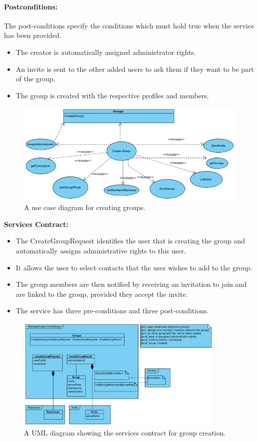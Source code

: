 \documentclass[11pt]{article}
\begin{document}
\paragraph{{Postconditions:}}The post-conditions specify the conditions which must hold true when the service has been provided.
\begin{itemize}
\item	The creator is automatically assigned administrator rights.
\item	An invite is sent to the other added users to ask them if they want to be part of the group.
\item	The group is created with the respective profiles and members.
\end{itemize}
\begin{figure}[H]
\centering
\includegraphics[width=5in]{./images/FR-create.jpg}
\caption[UC-figure-create-group]{A use case diagram for creating groups.}
\label{UC-figure-create-group}
\end{figure}
\textbf{Services Contract:}
\begin{itemize}
\item The CreateGroupRequest identifies the user that is creating the group and automatically assigns administrative rights to this user.
\item It allows the user to select contacts that the user wishes to add to the group.
\item The group members are then notified by receiving an invitation to join and are linked to the group, provided they accept the invite.
\item The service has three pre-conditions and three post-conditions.
\end{itemize}
\begin{figure}[H]
\centering
\includegraphics[width=380px]{./images/serviceContract-create.jpg} \newline
\caption[Create Group Services Contract]{A UML diagram showing the services contract for group creation.}
\label{SC-figure-create-group}
\end{figure}
\end{document}
